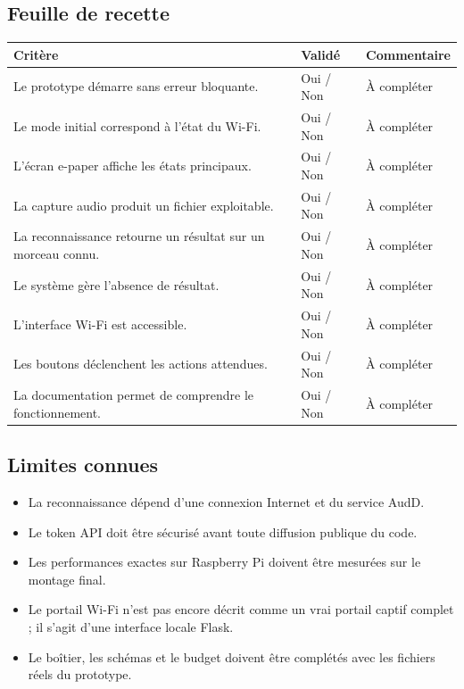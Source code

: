 \subsection{Feuille de recette}

\begin{longtable}{|p{8cm}|p{3cm}|p{3cm}|}
\hline
\textbf{Critère} & \textbf{Validé} & \textbf{Commentaire} \\
\hline
Le prototype démarre sans erreur bloquante. & Oui / Non & À compléter \\
\hline
Le mode initial correspond à l'état du Wi-Fi. & Oui / Non & À compléter \\
\hline
L'écran e-paper affiche les états principaux. & Oui / Non & À compléter \\
\hline
La capture audio produit un fichier exploitable. & Oui / Non & À compléter \\
\hline
La reconnaissance retourne un résultat sur un morceau connu. & Oui / Non & À compléter \\
\hline
Le système gère l'absence de résultat. & Oui / Non & À compléter \\
\hline
L'interface Wi-Fi est accessible. & Oui / Non & À compléter \\
\hline
Les boutons déclenchent les actions attendues. & Oui / Non & À compléter \\
\hline
La documentation permet de comprendre le fonctionnement. & Oui / Non & À compléter \\
\hline
\end{longtable}

\subsection{Limites connues}

\begin{itemize}
    \item La reconnaissance dépend d'une connexion Internet et du service AudD.
    \item Le token API doit être sécurisé avant toute diffusion publique du code.
    \item Les performances exactes sur Raspberry Pi doivent être mesurées sur le montage final.
    \item Le portail Wi-Fi n'est pas encore décrit comme un vrai portail captif complet ; il s'agit d'une interface locale Flask.
    \item Le boîtier, les schémas et le budget doivent être complétés avec les fichiers réels du prototype.
\end{itemize}

